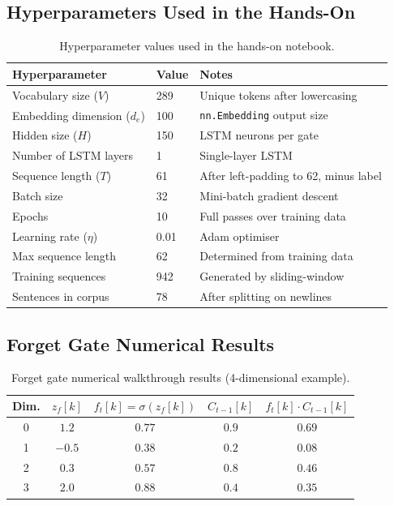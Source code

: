 \documentclass[12pt,a4paper]{article}
\begin{document}
\subsection{Hyperparameters Used in the Hands-On}
\label{subsec:hyperparams}

\begin{table}[ht]
\centering
\caption{Hyperparameter values used in the hands-on notebook.}
\label{tab:hyperparams}
\begin{tabular}{lll}
\toprule
\textbf{Hyperparameter}    & \textbf{Value} & \textbf{Notes} \\
\midrule
Vocabulary size ($V$)      & 289            & Unique tokens after lowercasing \\
Embedding dimension ($d_e$)& 100            & \texttt{nn.Embedding} output size \\
Hidden size ($H$)          & 150            & LSTM neurons per gate \\
Number of LSTM layers      & 1              & Single-layer LSTM \\
Sequence length ($T$)      & 61             & After left-padding to 62, minus label \\
Batch size                 & 32             & Mini-batch gradient descent \\
Epochs                     & 10             & Full passes over training data \\
Learning rate ($\eta$)     & 0.01           & Adam optimiser \\
Max sequence length        & 62             & Determined from training data \\
Training sequences         & 942            & Generated by sliding-window \\
Sentences in corpus        & 78             & After splitting on newlines \\
\bottomrule
\end{tabular}
\end{table}

\subsection{Forget Gate Numerical Results}
\label{subsec:forget-table}

\begin{table}[ht]
\centering
\caption{Forget gate numerical walkthrough results (4-dimensional example).}
\label{tab:forget-nums}
\begin{tabular}{ccccc}
\toprule
\textbf{Dim.} & $z_f[k]$ & $f_t[k] = \sigma(z_f[k])$ & $C_{t-1}[k]$ & $f_t[k]\cdot C_{t-1}[k]$ \\
\midrule
0 & $1.2$  & $0.77$ & $0.9$ & $0.69$ \\
1 & $-0.5$ & $0.38$ & $0.2$ & $0.08$ \\
2 & $0.3$  & $0.57$ & $0.8$ & $0.46$ \\
3 & $2.0$  & $0.88$ & $0.4$ & $0.35$ \\
\bottomrule
\end{tabular}
\end{table}
\end{document}
